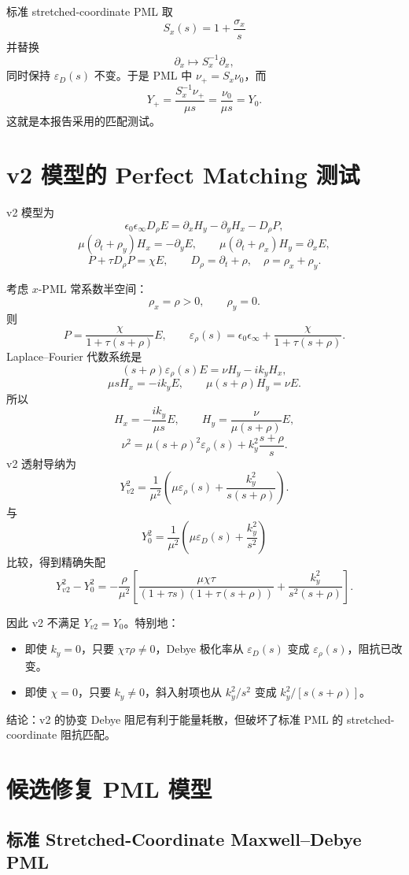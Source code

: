 \documentclass[UTF8,a4paper,11pt]{ctexart}
\newcommand{\eps}{\varepsilon}
\begin{document}
标准 stretched-coordinate PML 取
\[
S_x(s)=1+\frac{\sigma_x}{s}
\]
并替换
\[
\partial_x\mapsto S_x^{-1}\partial_x,
\]
同时保持 \(\eps_D(s)\) 不变。于是 PML 中 \(\nu_+=S_x\nu_0\)，而
\[
Y_+=\frac{S_x^{-1}\nu_+}{\mu s}
=\frac{\nu_0}{\mu s}=Y_0.
\]
这就是本报告采用的匹配测试。

\section{v2 模型的 Perfect Matching 测试}

v2 模型为
\[
\epsilon_0\epsilon_\infty D_\rho E
=\partial_xH_y-\partial_yH_x-D_\rho P,
\]
\[
\mu(\partial_t+\rho_y)H_x=-\partial_yE,\qquad
\mu(\partial_t+\rho_x)H_y=\partial_xE,
\]
\[
P+\tau D_\rho P=\chi E,\qquad D_\rho=\partial_t+\rho,\quad
\rho=\rho_x+\rho_y.
\]

考虑 \(x\)-PML 常系数半空间：
\[
\rho_x=\rho>0,\qquad \rho_y=0.
\]
则
\[
P=\frac{\chi}{1+\tau(s+\rho)}E,\qquad
\eps_\rho(s)
=\epsilon_0\epsilon_\infty+\frac{\chi}{1+\tau(s+\rho)}.
\]
Laplace--Fourier 代数系统是
\[
(s+\rho)\eps_\rho(s)E=\nu H_y-ik_yH_x,
\]
\[
\mu sH_x=-ik_yE,\qquad
\mu(s+\rho)H_y=\nu E.
\]
所以
\[
H_x=-\frac{ik_y}{\mu s}E,\qquad
H_y=\frac{\nu}{\mu(s+\rho)}E,
\]
\[
\nu^2=\mu(s+\rho)^2\eps_\rho(s)+k_y^2\frac{s+\rho}{s}.
\]
v2 透射导纳为
\[
Y_{v2}^2
=\frac{1}{\mu^2}\left(
\mu\eps_\rho(s)+\frac{k_y^2}{s(s+\rho)}
\right).
\]
与
\[
Y_0^2
=\frac{1}{\mu^2}\left(
\mu\eps_D(s)+\frac{k_y^2}{s^2}
\right)
\]
比较，得到精确失配
\[
\boxed{
Y_{v2}^2-Y_0^2
=-\frac{\rho}{\mu^2}\left[
\frac{\mu\chi\tau}{(1+\tau s)(1+\tau(s+\rho))}
+\frac{k_y^2}{s^2(s+\rho)}
\right].}
\]

因此 v2 不满足 \(Y_{v2}=Y_0\)。特别地：
\begin{itemize}
\item 即使 \(k_y=0\)，只要 \(\chi\tau\rho\ne0\)，Debye 极化率从
\(\eps_D(s)\) 变成 \(\eps_\rho(s)\)，阻抗已改变。
\item 即使 \(\chi=0\)，只要 \(k_y\ne0\)，斜入射项也从 \(k_y^2/s^2\) 变成
\(k_y^2/[s(s+\rho)]\)。
\end{itemize}

结论：v2 的协变 Debye 阻尼有利于能量耗散，但破坏了标准 PML 的
stretched-coordinate 阻抗匹配。

\section{候选修复 PML 模型}

\subsection{标准 Stretched-Coordinate Maxwell--Debye PML}
\end{document}
